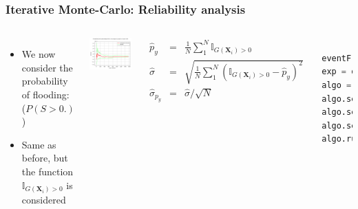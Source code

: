 \documentclass[aspectratio=169]{beamer}
\renewcommand{\footnotesize}{\tiny}
\begin{document}

\begin{frame}[containsverbatim]
\frametitle{Iterative Monte-Carlo: Reliability analysis}

\scriptsize{

\begin{columns}

\begin{itemize}
\item We now consider the probability of flooding:  ($P(S>0.)$) 
\item Same as before, but the function $\mathbb{I}_{G(\mathbf{X}_i)>0} $ is considered
\end{itemize}

    \includegraphics[width=1.\textwidth]{figures/Probability.png}

 
    
 \footnotesize
\begin{eqnarray*}
\widehat{p}_y & = & \frac{1}{N}\sum_1^N \mathbb{I}_{G(\mathbf{X}_i)>0} \\
\widehat{\sigma}  & = & \sqrt{\frac{1}{N}\sum_1^N (\mathbb{I}_{G(\mathbf{X}_i)>0}-\hat{p}_y)^2} \\
\widehat{\sigma}_{p_y} & = & \widehat{\sigma} / \sqrt{N}
\end{eqnarray*}

\tiny 
\begin{lstlisting}[language=Python, numbers = none]

eventF = ot.ThresholdEvent(outputVector, ot.GreaterOrEqual(), 0.0)
exp = ot.MonteCarloExperiment()
algo = ot.ProbabilitySimulationAlgorithm(eventF, exp)
algo.setMaximumOuterSampling(100000)
algo.setMaximumCoefficientOfVariation(0.01)
algo.setBlockSize(10)
algo.run()


\end{lstlisting}

	
\end{columns}

}

\end{frame}
\end{document}
